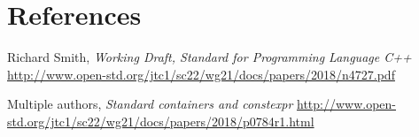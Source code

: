 \documentclass{wg21}
\begin{document}
\section{References}
\renewcommand{\section}[2]{}%
\begin{thebibliography}{9}

    Richard Smith,
    \emph{Working Draft, Standard for Programming Language C++}\newline
    \url{http://www.open-std.org/jtc1/sc22/wg21/docs/papers/2018/n4727.pdf}

    Multiple authors,
    \emph{Standard containers and constexpr}\newline
    \url{http://www.open-std.org/jtc1/sc22/wg21/docs/papers/2018/p0784r1.html}

\end{thebibliography}
\end{document}

